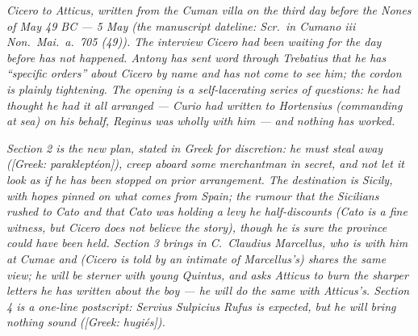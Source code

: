 
\textit{Cicero to Atticus, written from the Cuman villa
on the third day before the Nones of May 49 BC --- 5
May (the manuscript dateline: \textit{Scr.\ in Cumano
iii Non.\ Mai.\ a.\ 705 (49)}). The interview Cicero
had been waiting for the day before has not happened.
Antony has sent word through Trebatius that he has
``specific orders'' about Cicero by name and has not
come to see him; the cordon is plainly tightening. The
opening is a self-lacerating series of questions: he
had thought he had it all arranged --- Curio had written
to Hortensius (commanding at sea) on his behalf, Reginus
was wholly with him --- and nothing has worked.}

\textit{Section 2 is the new plan, stated in Greek for
discretion: he must steal away
(\textit{[Greek: parakleptéon]}), creep aboard some
merchantman in secret, and not let it look as if he has
been stopped on prior arrangement. The destination is
Sicily, with hopes pinned on what comes from Spain; the
rumour that the Sicilians rushed to Cato and that Cato
was holding a levy he half-discounts (Cato is a fine
witness, but Cicero does not believe the story), though
he is sure the province could have been held. Section 3
brings in C.~Claudius Marcellus, who is with him at
Cumae and (Cicero is told by an intimate of Marcellus's)
shares the same view; he will be sterner with young
Quintus, and asks Atticus to burn the sharper letters he
has written about the boy --- he will do the same with
Atticus's. Section 4 is a one-line postscript: Servius
Sulpicius Rufus is expected, but he will bring nothing
sound (\textit{[Greek: hugiés]}).}
